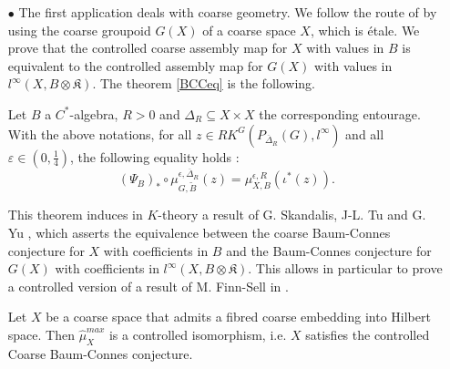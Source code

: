 \begin{itemize}

\item[$\bullet$] The first application deals with coarse geometry. We follow the route of \cite{SkTuYu} by using the coarse groupoid $G(X)$ of a coarse space $X$, which is étale. We prove that the controlled coarse assembly map for $X$ with values in $B$ is equivalent to the controlled assembly map for $G(X)$ with values in $l^\infty(X,B\otimes\mathfrak K)$. The theorem \ref{BCCeq} is the following.\\

\begin{thm}
Let $B$ a $C^*$-algebra, $R>0$ and $\Delta_R\subseteq X\times X$ the corresponding entourage. With the above notations, for all $z\in RK^G(P_{\overline \Delta_R}(G),l^\infty)$ and all $\varepsilon\in(0,\frac{1}{4})$, the following equality holds :
\[(\Psi_B)_*\circ\mu^{\epsilon,\overline\Delta_R}_{G,\tilde B} (z) = \mu_{X,B}^{\epsilon,R}(\iota^*(z)).\]
\end{thm}

This theorem induces in $K$-theory a result of G. Skandalis, J-L. Tu and G. Yu \cite{SkTuYu}, which asserts the equivalence between the coarse Baum-Connes conjecture for $X$ with coefficients in $B$ and the Baum-Connes conjecture for $G(X)$ with coefficients in $l^\infty(X,B\otimes \mathfrak K)$. This allows in particular to prove a controlled version of a result of M. Finn-Sell in \cite{FinnSellFibred}. \\

\begin{cor}
Let $X$ be a coarse space that admits a fibred coarse embedding into Hilbert space. Then $\hat \mu_{X}^{max}$ is a controlled isomorphism, i.e. $X$ satisfies the controlled Coarse Baum-Connes conjecture.\\
\end{cor}



\end{itemize}
